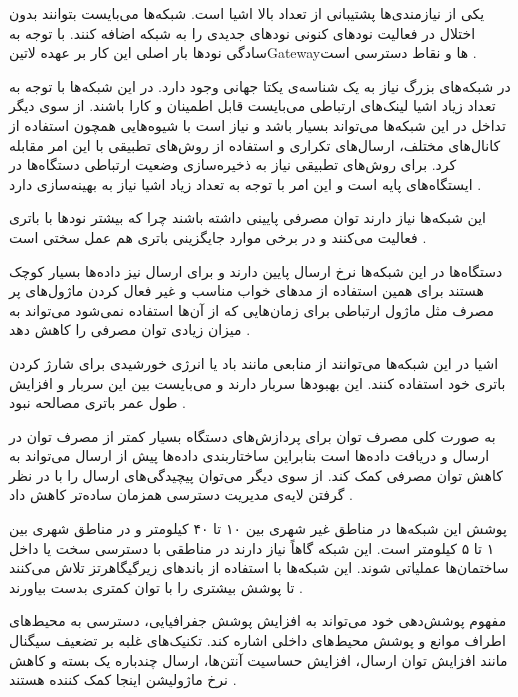 یکی از نیازمندی‌ها پشتیبانی از تعداد بالا اشیا است. شبکه‌ها می‌بایست بتوانند بدون اختلال در فعالیت نودهای کنونی نودهای جدیدی را به شبکه اضافه کنند.
با توجه به سادگی نودها بار اصلی این کار بر عهده ‌لاتین{Gateway}ها و نقاط دسترسی است
.

در شبکه‌های بزرگ نیاز به یک شناسه‌ی یکتا جهانی وجود دارد.
در این شبکه‌ها با توجه به تعداد زیاد اشیا لینک‌های ارتباطی می‌بایست قابل اطمینان و کارا باشند.
از سوی دیگر تداخل در این شبکه‌ها می‌تواند بسیار باشد و نیاز است با شیوه‌هایی همچون استفاده از کانال‌های مختلف،
ارسال‌های تکراری و استفاده از روش‌های تطبیقی با این امر مقابله کرد.
برای روش‌های تطبیقی نیاز به ذخیره‌سازی وضعیت ارتباطی دستگاه‌ها در ایستگاه‌های پایه است و این امر با توجه به تعداد زیاد
اشیا نیاز به بهینه‌سازی دارد
.


این شبکه‌ها نیاز دارند توان مصرفی پایینی داشته باشند چرا که بیشتر نودها با باتری فعالیت می‌کنند
و در برخی موارد جایگزینی باتری هم عمل سختی است
.

دستگاه‌ها در این شبکه‌ها نرخ ارسال پایین دارند و برای ارسال نیز داده‌ها بسیار کوچک هستند
برای همین استفاده از مدهای خواب مناسب و غیر فعال کردن ماژول‌های پر مصرف مثل ماژول
ارتباطی برای زمان‌هایی که از آن‌ها استفاده نمی‌شود می‌تواند به میزان زیادی توان مصرفی را کاهش دهد
.

اشیا در این شبکه‌ها می‌توانند از منابعی مانند باد یا انرژی خورشیدی برای شارژ کردن باتری خود استفاده کنند.
این بهبودها سربار دارند و می‌بایست بین این سربار و افزایش طول عمر باتری مصالحه نبود
.

به صورت کلی مصرف توان برای پردازش‌های دستگاه بسیار کمتر از مصرف توان در ارسال و دریافت داده‌ها است
بنابراین ساختاربندی داده‌ها پیش از ارسال می‌تواند به کاهش توان مصرفی کمک کند. از سوی دیگر می‌توان پیچیدگی‌های
ارسال را با در نظر گرفتن لایه‌ی مدیریت دسترسی همزمان ساده‌تر کاهش داد
.


پوشش این شبکه‌ها در مناطق غیر شهری بین ۱۰ تا ۴۰ کیلومتر و
در مناطق شهری بین ۱ تا ۵ کیلومتر است.
این شبکه گاهاً نیاز دارند در مناطقی با دسترسی سخت یا داخل ساختمان‌ها
عملیاتی شوند. این شبکه‌ها با استفاده از باندهای زیرگیگاهرتز تلاش می‌کنند تا پوشش بیشتری را با توان کمتری بدست بیاورند
.

مفهوم پوشش‌دهی خود می‌تواند به افزایش پوشش جفرافیایی، دسترسی به محیط‌های اطراف موانع و پوشش محیط‌های داخلی اشاره کند.
تکنیک‌های غلبه بر تضعیف سیگنال مانند افزایش توان ارسال، افزایش حساسیت آنتن‌ها، ارسال چندباره یک بسته و کاهش نرخ ماژولیشن اینجا کمک کننده هستند
.

